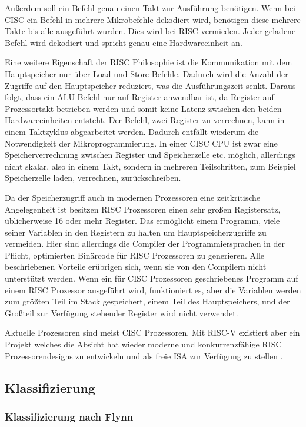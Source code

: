 \documentclass[12pt]{article}
\begin{document}
Außerdem soll ein Befehl genau einen Takt zur Ausführung benötigen. Wenn bei CISC ein Befehl in mehrere Mikrobefehle dekodiert wird, benötigen diese mehrere Takte bis alle ausgeführt wurden. Dies wird bei RISC vermieden. Jeder geladene Befehl wird dekodiert und spricht genau eine Hardwareeinheit an.

Eine weitere Eigenschaft der RISC Philosophie ist die Kommunikation mit dem Hauptspeicher nur über Load und Store Befehle. Dadurch wird die Anzahl der Zugriffe auf den Hauptspeicher reduziert, was die Ausführungszeit senkt. Daraus folgt, dass ein ALU Befehl nur auf Register anwendbar ist, da Register auf Prozessortakt betrieben werden und somit keine Latenz zwischen den beiden Hardwareeinheiten entsteht. Der Befehl, zwei Register zu verrechnen, kann in einem Taktzyklus abgearbeitet werden. Dadurch entfällt wiederum die Notwendigkeit der Mikroprogrammierung. In einer CISC CPU ist zwar eine Speicherverrechnung zwischen Register und Speicherzelle etc. möglich, allerdings nicht skalar, also in einem Takt, sondern in mehreren Teilschritten, zum Beispiel Speicherzelle laden, verrechnen, zurückschreiben.


Da der Speicherzugriff auch in modernen Prozessoren eine zeitkritische Angelegenheit ist besitzen RISC Prozessoren einen sehr großen Registersatz, üblicherweise 16 oder mehr Register. Das ermöglicht einem Programm, viele seiner Variablen in den Registern zu halten um Hauptspeicherzugriffe zu vermeiden. Hier sind allerdings die Compiler der Programmiersprachen in der Pflicht, optimierten Binärcode für RISC Prozessoren zu generieren. Alle beschriebenen Vorteile erübrigen sich, wenn sie von den Compilern nicht unterstützt werden. Wenn ein für CISC Prozessoren geschriebenes Programm auf einem RISC Prozessor ausgeführt wird, funktioniert es, aber die Variablen werden zum größten Teil im Stack gespeichert, einem Teil des Hauptspeichers, und der Großteil zur Verfügung stehender Register wird nicht verwendet. 
\par
Aktuelle Prozessoren sind meist CISC Prozessoren. Mit RISC-V existiert aber ein Projekt welches die Absicht hat wieder moderne und konkurrenzfähige RISC Prozessorendesigns zu entwickeln und als freie ISA zur Verfügung zu stellen . 
\subsection{Klassifizierung}
\subsubsection{Klassifizierung nach Flynn}
\end{document}
